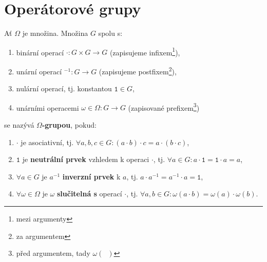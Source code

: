 \section{Operátorové grupy}
\begin{definice}
	Ať $\Omega$ je množina. Množina $G$ spolu s:
	\begin{enumerate}[$(i)$]
		\item binární operací $\cdot : G\times G\to G$ (zapisujeme infixem\footnote{mezi argumenty}),
		\item unární operací $^{-1}:G\to G$ (zapisujeme postfixem\footnote{za argumentem}),
		\item nulární operací, tj. konstantou $\mathtt 1\in G$,
		\item unárními operacemi $\omega \in \Omega: G\to G$ (zapisované prefixem\footnote{před argumentem, tady $\omega(\phantom x)$})
	\end{enumerate}
	se nazývá \textbf{$\Omega$-grupou}, pokud:
	\begin{enumerate}[$(i)$]
		\item $\cdot$ je asociativní, tj. $\forall a,b,c\in G: (a\cdot b)\cdot c = a\cdot (b\cdot c)$,
		\item $\mathtt 1$ je \textbf{neutrální prvek} vzhledem k operaci $\cdot$, tj. $\forall a \in G:a\cdot \mathtt 1 = \mathtt 1 \cdot a=a$,
		\item $\forall a \in G$ je $a^{-1}$ \textbf{inverzní prvek} k $a$, tj. $a\cdot a^{-1}=a^{-1}\cdot a=\mathtt 1$,
		\item $\forall \omega \in \Omega$ je $\omega$ \textbf{slučitelná s} operací $\cdot$, tj. $\forall a,b \in G: \omega(a\cdot b)=\omega(a)\cdot \omega(b).$
	\end{enumerate}
\end{definice}

